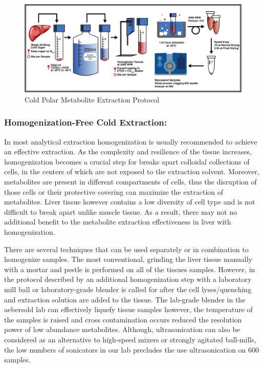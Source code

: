 \documentclass[a4paper,11pt,twoside]{book}
\begin{document}
	\begin{figure}
		\centering
		\includegraphics[width=\linewidth]{2.Optimizaiton_Figures/Metab-Cold-Proto-MH-20170120}
		\caption{Cold Polar Metabolite Extraction Protocol}
		\label{fig:Cold Extraction Protocol}
	\end{figure}
		
	\subsubsection*{Homogenization-Free Cold Extraction:}
	
	In most analytical extraction homogenization is usually recommended to achieve an effective extraction\citep{Mushtaq2014ExtractionMetabolome}. As the complexity and resilience of the tissue increases, homogenization becomes a crucial step for breaks apart colloidal collections of cells, in the centers of which are not exposed to the extraction solvent. Moreover, metabolites are present in different compartments of cells, thus the disruption of those cells or their protective covering can maximize the extraction of metabolites. Liver tissue however contains a low diversity of cell type and is not difficult to break apart unlike muscle tissue. As a result, there may not no additional benefit to the metabolite extraction effectiveness in liver with homogenization.
		
	There are several techniques that can be used separately or in combination to homogenize samples. The most conventional, grinding the liver tissue manually with a mortar and pestle is performed on all of the tissues samples. However, in the protocol described by \citeauthor{Williams2016SystemsFunction} an additional homogenization step with a laboratory mill ball or laboratory-grade blender is called for after the cell lyses/quenching and extraction solution are added to the tissue. The lab-grade blender in the aebersold lab can effectively liquefy tissue samples however, the temperature of the samples is raised and cross contamination occurs reduced the resolution power of low abundance metabolites. Although, ultrasonication can also be considered as an alternative to high-speed mixers or strongly agitated ball-mills, the low numbers of sonicators in our lab precludes the use  ultrasonication on 600 samples.
	
\end{document}
